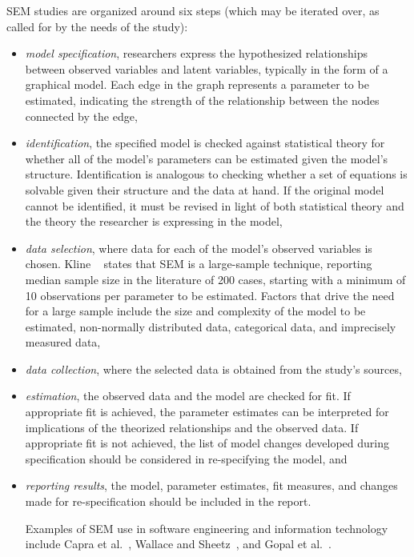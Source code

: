SEM studies are organized around six steps (which may be iterated over, as called for by the needs of the study): 
\begin{itemize}
\item \textit{model specification}, researchers express the hypothesized relationships between observed variables and latent variables, typically in the form of a graphical model. Each edge in the graph represents a parameter to be estimated, indicating the strength of the relationship between the nodes connected by the edge,

\item \textit{identification}, the specified model is checked against statistical theory for whether all of the model’s parameters can be estimated given the model's structure. Identification is analogous to checking whether a set of equations is solvable given their structure and the data at hand. If the original model cannot be identified, it must be revised in light of both statistical theory and the theory the researcher is expressing in the model,

\item \textit{data selection}, where data for each of the model’s observed variables is chosen. Kline ~\cite{kline2015principles} states that SEM is a large-sample technique, reporting median sample size in the literature of 200 cases, starting with a minimum of 10 observations per parameter to be estimated.  Factors that drive the need for a large sample include the size and complexity of the model to be estimated, non-normally distributed data, categorical data, and imprecisely measured data,

\item \textit{data collection}, where the selected data is obtained from the study's sources,

\item \textit{estimation}, the observed data and the model are checked for fit.  If appropriate fit is achieved, the parameter estimates can be interpreted for implications of the theorized relationships and the observed data. If appropriate fit is not achieved, the list of model changes developed during specification should be considered in re-specifying the model, and

\item \textit{reporting results}, the model, parameter estimates,  fit measures, and changes made for re-specification should be included in the report.

Examples of SEM use in software engineering and information technology include Capra et al.~\cite{capra2008empirical}, Wallace and Sheetz~\cite{wallace2014adoption}, and Gopal et al.~\cite{gopal2005impact}.
\end{itemize}

